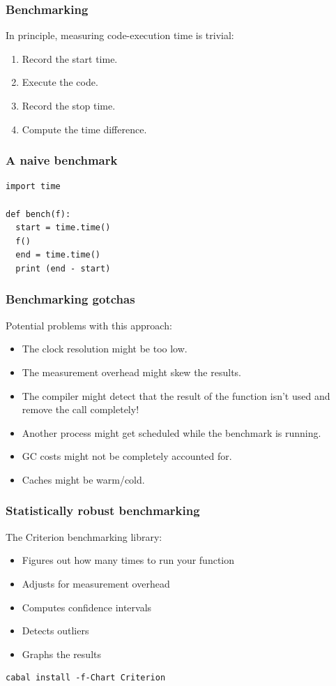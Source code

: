 \documentclass{beamer}
\begin{document}
\begin{frame}[fragile]
  \frametitle{Benchmarking}

  In principle, measuring code-execution time is trivial:
  \begin{enumerate}
  \item Record the start time.
  \item Execute the code.
  \item Record the stop time.
  \item Compute the time difference.
  \end{enumerate}
\end{frame}

\begin{frame}[fragile]
  \frametitle{A naive benchmark}

\begin{verbatim}
import time

def bench(f):
  start = time.time()
  f()
  end = time.time()
  print (end - start)
\end{verbatim}
\end{frame}

\begin{frame}
  \frametitle{Benchmarking gotchas}

  Potential problems with this approach:
  \begin{itemize}
  \item The clock resolution might be too low.
  \item The measurement overhead might skew the results.
  \item The compiler might detect that the result of the function
    isn't used and remove the call completely!
  \item Another process might get scheduled while the benchmark is
    running.
  \item GC costs might not be completely accounted for.
  \item Caches might be warm/cold.
  \end{itemize}
\end{frame}

\begin{frame}[fragile]
  \frametitle{Statistically robust benchmarking}

  The Criterion benchmarking library:
  \begin{itemize}
  \item Figures out how many times to run your function
  \item Adjusts for measurement overhead
  \item Computes confidence intervals
  \item Detects outliers
  \item Graphs the results
  \end{itemize}

\begin{verbatim}
cabal install -f-Chart Criterion
\end{verbatim}
\end{frame}
\end{document}
